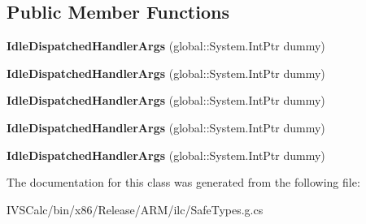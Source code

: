 \subsection*{Public Member Functions}
\begin{DoxyCompactItemize}
\item 
\mbox{\label{class_windows_1_1_u_i_1_1_core_1_1_idle_dispatched_handler_args_affc1a1c3f1b2ec08f17c196c7aa13729}} 
{\bfseries Idle\+Dispatched\+Handler\+Args} (global\+::\+System.\+Int\+Ptr dummy)
\item 
\mbox{\label{class_windows_1_1_u_i_1_1_core_1_1_idle_dispatched_handler_args_affc1a1c3f1b2ec08f17c196c7aa13729}} 
{\bfseries Idle\+Dispatched\+Handler\+Args} (global\+::\+System.\+Int\+Ptr dummy)
\item 
\mbox{\label{class_windows_1_1_u_i_1_1_core_1_1_idle_dispatched_handler_args_affc1a1c3f1b2ec08f17c196c7aa13729}} 
{\bfseries Idle\+Dispatched\+Handler\+Args} (global\+::\+System.\+Int\+Ptr dummy)
\item 
\mbox{\label{class_windows_1_1_u_i_1_1_core_1_1_idle_dispatched_handler_args_affc1a1c3f1b2ec08f17c196c7aa13729}} 
{\bfseries Idle\+Dispatched\+Handler\+Args} (global\+::\+System.\+Int\+Ptr dummy)
\item 
\mbox{\label{class_windows_1_1_u_i_1_1_core_1_1_idle_dispatched_handler_args_affc1a1c3f1b2ec08f17c196c7aa13729}} 
{\bfseries Idle\+Dispatched\+Handler\+Args} (global\+::\+System.\+Int\+Ptr dummy)
\end{DoxyCompactItemize}


The documentation for this class was generated from the following file\+:\begin{DoxyCompactItemize}
\item 
I\+V\+S\+Calc/bin/x86/\+Release/\+A\+R\+M/ilc/Safe\+Types.\+g.\+cs\end{DoxyCompactItemize}
